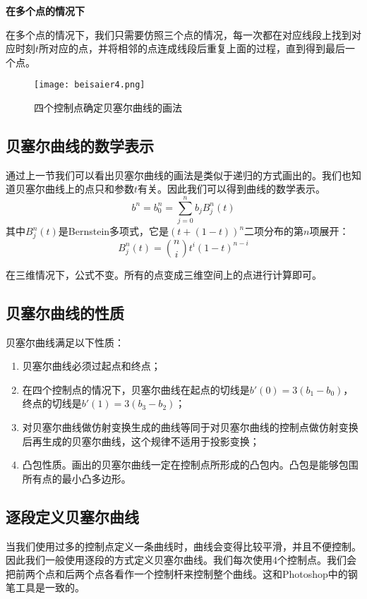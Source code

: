 \documentclass[openany]{progbookcn}
\begin{document}
\textbf{在多个点的情况下}

在多个点的情况下，我们只需要仿照三个点的情况，每一次都在对应线段上找到对应时刻$t$所对应的点，并将相邻的点连成线段后重复上面的过程，直到得到最后一个点。

\begin{figure}[H]
\centering
\texttt{[image: beisaier4.png]}
\caption{四个控制点确定贝塞尔曲线的画法}
\label{fig:beisaier4}
\end{figure}

\subsection{贝塞尔曲线的数学表示}

通过上一节我们可以看出贝塞尔曲线的画法是类似于递归的方式画出的。我们也知道贝塞尔曲线上的点只和参数$t$有关。因此我们可以得到曲线的数学表示。
\begin{equation}
	b^n=b_0^n=\sum_{j=0}^nb_jB_j^n(t)
\end{equation}
其中$B_j^n(t)$是Bernstein多项式，它是$(t+(1-t))^n$二项分布的第$n$项展开：
\begin{equation}
	B_j^n(t)=\binom{n}{i}t^i(1-t)^{n-i}
\end{equation}

在三维情况下，公式不变。所有的点变成三维空间上的点进行计算即可。

\subsection{贝塞尔曲线的性质}
贝塞尔曲线满足以下性质：
\begin{enumerate}
	\item 贝塞尔曲线必须过起点和终点；
	\item 在四个控制点的情况下，贝塞尔曲线在起点的切线是$b'(0)=3(b_1-b_0)$，终点的切线是$b'(1)=3(b_3-b_2)$；
	\item 对贝塞尔曲线做仿射变换生成的曲线等同于对贝塞尔曲线的控制点做仿射变换后再生成的贝塞尔曲线，这个规律不适用于投影变换；
	\item 凸包性质。画出的贝塞尔曲线一定在控制点所形成的凸包内。凸包是能够包围所有点的最小凸多边形。
\end{enumerate}

\subsection{逐段定义贝塞尔曲线}
当我们使用过多的控制点定义一条曲线时，曲线会变得比较平滑，并且不便控制。因此我们一般使用逐段的方式定义贝塞尔曲线。我们每次使用4个控制点。我们会把前两个点和后两个点各看作一个控制杆来控制整个曲线。这和Photoshop中的钢笔工具是一致的。
\end{document}
